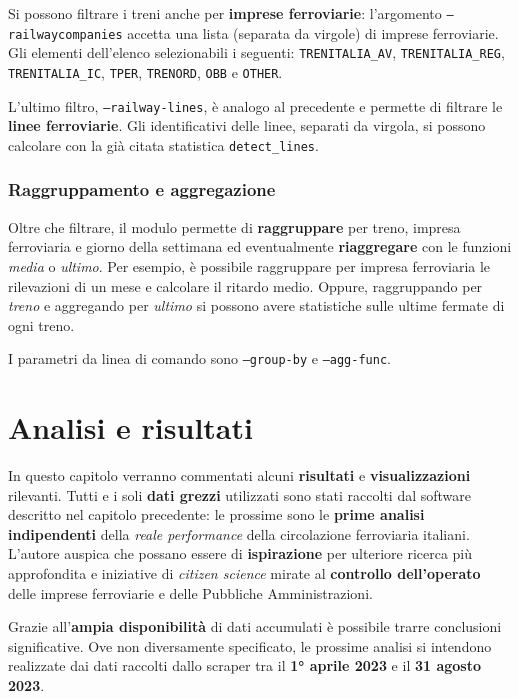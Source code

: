 \documentclass[12pt,italian]{report}
\begin{document}
Si possono filtrare i treni anche per \textbf{imprese ferroviarie}:
l'argomento \texttt{--railway\-companies} accetta una lista (separata
da virgole) di imprese ferroviarie.  Gli elementi dell'elenco
selezionabili i seguenti: \texttt{TRENITALIA\_\-AV},
\texttt{TRENITALIA\_\-REG}, \texttt{TRENITALIA\_\-IC}, \texttt{TPER},
\texttt{TRENORD}, \texttt{OBB} e \texttt{OTHER}.

L'ultimo filtro, \texttt{--railway\--lines}, è analogo al precedente e
permette di filtrare le \textbf{linee ferroviarie}.  Gli
identificativi delle linee, separati da virgola, si possono calcolare
con la già citata statistica \texttt{detect\-\_lines}.

\subsection{Raggruppamento e aggregazione}

Oltre che filtrare, il modulo permette di \textbf{raggruppare} per
treno, impresa ferroviaria e giorno della settimana ed eventualmente
\textbf{riaggregare} con le funzioni \textit{media} o \textit{ultimo}.
Per esempio, è possibile raggruppare per impresa ferroviaria le
rilevazioni di un mese e calcolare il ritardo medio.  Oppure,
raggruppando per \textit{treno} e aggregando per \textit{ultimo} si
possono avere statistiche sulle ultime fermate di ogni treno.

I parametri da linea di comando sono \texttt{--group\--by} e
\texttt{--agg\--func}.

\chapter{Analisi e risultati}
\label{analisi}

In questo capitolo verranno commentati alcuni \textbf{risultati} e
\textbf{visualizzazioni} rilevanti.  Tutti e i soli \textbf{dati
    grezzi} utilizzati sono stati raccolti dal software descritto nel
capitolo precedente: le prossime sono le \textbf{prime analisi
    indipendenti} della \textit{reale performance} della circolazione
ferroviaria italiani.  L'autore auspica che possano essere di
\textbf{ispirazione} per ulteriore ricerca più approfondita e
iniziative di \textit{citizen science} mirate al \textbf{controllo
    dell'operato} delle imprese ferroviarie e delle Pubbliche
Amministrazioni.

Grazie all'\textbf{ampia disponibilità} di dati accumulati è possibile
trarre conclusioni significative.  Ove non diversamente specificato,
le prossime analisi si intendono realizzate dai dati raccolti dallo
scraper tra il \textbf{1° aprile 2023} e il \textbf{31 agosto 2023}.
\end{document}
